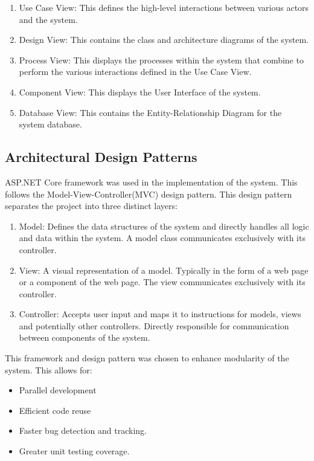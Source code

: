 \documentclass[11pt]{article}
\begin{document}
\begin{enumerate}
\item Use Case View: This defines the high-level interactions between various actors and the system.
\item Design View: This contains the class and architecture diagrams of the system.
\item Process View: This displays the processes within the system that combine to perform the various interactions defined in the Use Case View.
\item Component View: This displays the User Interface of the system.
\item Database View: This contains the Entity-Relationship Diagram for the system database.
\end{enumerate} 
\subsection{Architectural Design Patterns}
ASP.NET Core framework was used in the implementation of the system. This follows the Model-View-Controller(MVC) design pattern. This design pattern separates the project into three distinct layers:

\begin{enumerate}
	\item Model: Defines the data structures of the system and directly handles all logic and data within the system. A model class communicates exclusively with its controller.
	\item View: A visual representation of a model. Typically in the form of a web page or a component of the web page. The view communicates exclusively with its controller.
	\item Controller: Accepts user input and maps it to instructions for models, views and potentially other controllers. Directly responsible for communication between components of the system.
	
	  
\end{enumerate} 

This framework and design pattern was chosen to enhance modularity of the system. This allows for: 
\begin{itemize}
	\item Parallel development
	\item Efficient code reuse
	\item Faster bug detection and tracking.
	\item Greater unit testing coverage.
	
\end{itemize} 
 
\end{document}
